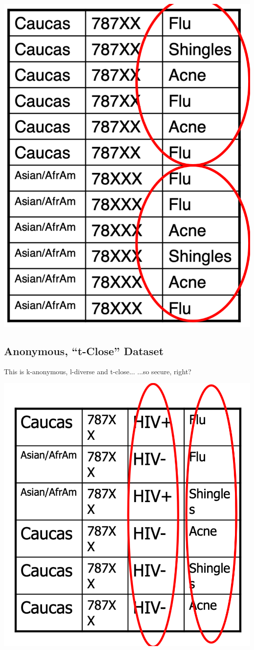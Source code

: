 \documentclass[11pt]{article}
\theoremstyle{definition}
\begin{document}
\includegraphics[width=\textwidth/4]{24.png}

\subsection{Anonymous, “t-Close” Dataset}
This is k-anonymous,
l-diverse and t-close...
...so secure, right?

\includegraphics[width=\textwidth/3]{25.png}
\end{document}
